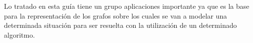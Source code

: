 Lo tratado en esta guía tiene un grupo aplicaciones importante ya que es la base para la representación de los grafos sobre los cuales se van a modelar una determinada situación para ser resuelta con la utilización de un determinado algoritmo. 